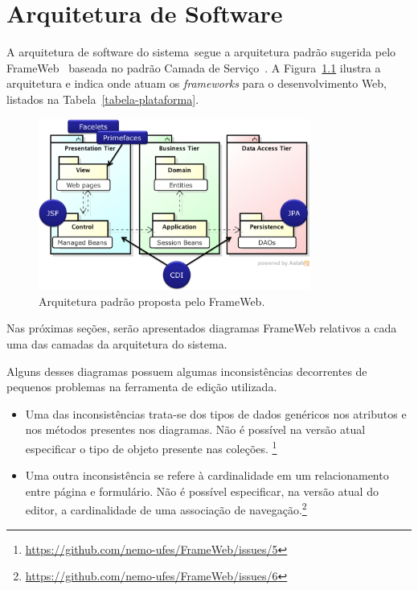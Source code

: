 
\chapter{Arquitetura de Software}
\label{sec-arquitetura}

A arquitetura de software do sistema~\imprimirtitulo  segue a arquitetura padrão sugerida pelo FrameWeb~\cite{souza:masterthesis07,souza-et-al:iism09} baseada no padrão Camada de Serviço~\cite{fowler:book02}. A Figura~\ref{figura-arquitetura-padrao} ilustra a arquitetura e indica onde atuam os \textit{frameworks} para o desenvolvimento Web, listados na Tabela~\ref{tabela-plataforma}.

\begin{figure}[h]
	\centering
	\includegraphics[width=0.8\textwidth]{figuras/figura-arquitetura-padrao.png}
	\caption{Arquitetura padrão proposta pelo FrameWeb.}
	\label{figura-arquitetura-padrao}
\end{figure}

Nas próximas seções, serão apresentados diagramas FrameWeb relativos a cada uma das camadas da arquitetura do sistema.

Alguns desses diagramas possuem algumas inconsistências decorrentes de pequenos problemas na ferramenta de edição utilizada.

\begin{itemize}

\item Uma das inconsistências trata-se dos tipos de dados genéricos nos atributos e nos métodos presentes nos diagramas. Não é possível na versão atual especificar o tipo de objeto presente nas coleções. \footnote{\url{https://github.com/nemo-ufes/FrameWeb/issues/5}}

\item Uma outra inconsistência se refere à cardinalidade em um relacionamento entre página e formulário. Não é possível especificar, na versão atual do editor, a cardinalidade de uma associação de navegação.\footnote{\url{https://github.com/nemo-ufes/FrameWeb/issues/6}}

\end{itemize}

